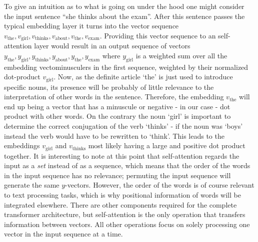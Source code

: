 To give an intuition as to what is going on under the hood one might consider the input sentence ``she thinks about the exam''. After this sentence passes the typical embedding layer it turns into the vector sequence $ v_{\text{the}}, v_{\text{girl}}, v_{\text{thinks}}, v_{\text{about}}, v_{\text{the}}, v_{\text{exam}} $. Providing this vector sequence to an self-attention layer would result in an output sequence of vectors $ y_{\text{the}}, y_{\text{girl}}, y_{\text{thinks}}, y_{\text{about}}, y_{\text{the}}, y_{\text{exam}} $ where $ y_{\text{girl}} $ is a weighted sum over all the embedding vectominusculers in the first sequence, weighted by their normalized dot-product $ v_{\text{girl}} $. Now, as the definite article `the' is just used to introduce specific nouns, its presence will be probably of little relevance to the interpretation of other words in the sentence. Therefore, the embedding $ v_{\text{the}} $ will end up being a vector that has a minuscule or negative - in our case - dot product with other words. On the contrary the noun `girl' is important to determine the correct conjugation of the verb `thinks' - if the noun was `boys' instead the verb would have to be rewritten to `think'. This leads to the embeddings $ v_{\text{girl}} $ and $ v_{\text{thinks}} $ most likely having a large and positive dot product together. It is interesting to note at this point that self-attention regards the input as a \textit{set} instead of as a sequence, which means that the order of the words in the input sequence has no relevance; permuting the input sequence will generate the same $ y $-vectors. However, the order of the words is of course relevant to text processing tasks, which is why positional information of words will be integrated elsewhere. There are other components required for the complete transformer architecture, but self-attention is the only operation that transfers information between vectors. All other operations focus on solely processing one vector in the input sequence at a time.

